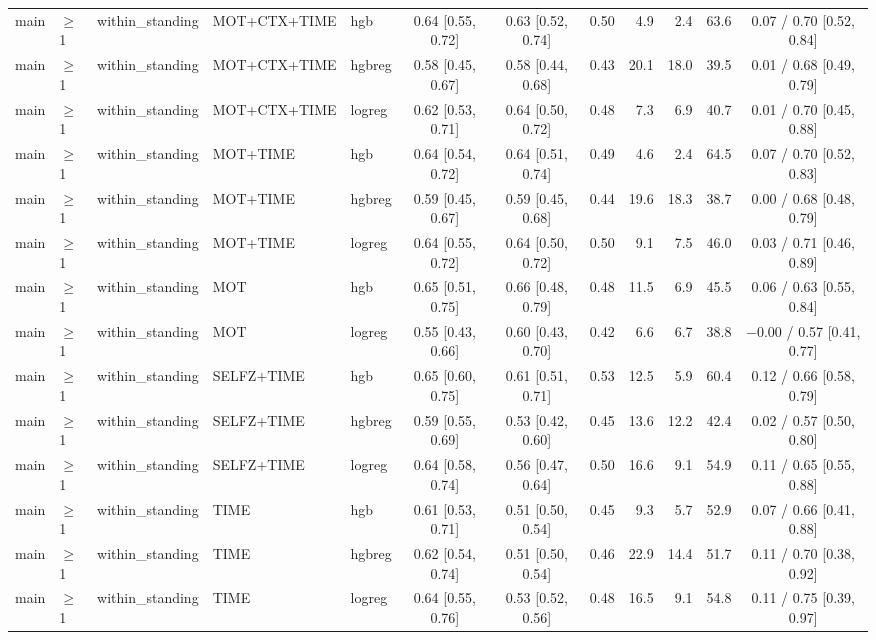 \begin{longtable}{@{}lllllcccrrrc@{}}
main & $\geq$1 & within\_standing & MOT+CTX+TIME & hgb & 0.64 [0.55, 0.72] & 0.63 [0.52, 0.74] & 0.50 & 4.9 & 2.4 & 63.6 & 0.07 / 0.70 [0.52, 0.84] \\
main & $\geq$1 & within\_standing & MOT+CTX+TIME & hgbreg & 0.58 [0.45, 0.67] & 0.58 [0.44, 0.68] & 0.43 & 20.1 & 18.0 & 39.5 & 0.01 / 0.68 [0.49, 0.79] \\
main & $\geq$1 & within\_standing & MOT+CTX+TIME & logreg & 0.62 [0.53, 0.71] & 0.64 [0.50, 0.72] & 0.48 & 7.3 & 6.9 & 40.7 & 0.01 / 0.70 [0.45, 0.88] \\
main & $\geq$1 & within\_standing & MOT+TIME & hgb & 0.64 [0.54, 0.72] & 0.64 [0.51, 0.74] & 0.49 & 4.6 & 2.4 & 64.5 & 0.07 / 0.70 [0.52, 0.83] \\
main & $\geq$1 & within\_standing & MOT+TIME & hgbreg & 0.59 [0.45, 0.67] & 0.59 [0.45, 0.68] & 0.44 & 19.6 & 18.3 & 38.7 & 0.00 / 0.68 [0.48, 0.79] \\
main & $\geq$1 & within\_standing & MOT+TIME & logreg & 0.64 [0.55, 0.72] & 0.64 [0.50, 0.72] & 0.50 & 9.1 & 7.5 & 46.0 & 0.03 / 0.71 [0.46, 0.89] \\
main & $\geq$1 & within\_standing & MOT & hgb & 0.65 [0.51, 0.75] & 0.66 [0.48, 0.79] & 0.48 & 11.5 & 6.9 & 45.5 & 0.06 / 0.63 [0.55, 0.84] \\
main & $\geq$1 & within\_standing & MOT & logreg & 0.55 [0.43, 0.66] & 0.60 [0.43, 0.70] & 0.42 & 6.6 & 6.7 & 38.8 & $-$0.00 / 0.57 [0.41, 0.77] \\
main & $\geq$1 & within\_standing & SELFZ+TIME & hgb & 0.65 [0.60, 0.75] & 0.61 [0.51, 0.71] & 0.53 & 12.5 & 5.9 & 60.4 & 0.12 / 0.66 [0.58, 0.79] \\
main & $\geq$1 & within\_standing & SELFZ+TIME & hgbreg & 0.59 [0.55, 0.69] & 0.53 [0.42, 0.60] & 0.45 & 13.6 & 12.2 & 42.4 & 0.02 / 0.57 [0.50, 0.80] \\
main & $\geq$1 & within\_standing & SELFZ+TIME & logreg & 0.64 [0.58, 0.74] & 0.56 [0.47, 0.64] & 0.50 & 16.6 & 9.1 & 54.9 & 0.11 / 0.65 [0.55, 0.88] \\
main & $\geq$1 & within\_standing & TIME & hgb & 0.61 [0.53, 0.71] & 0.51 [0.50, 0.54] & 0.45 & 9.3 & 5.7 & 52.9 & 0.07 / 0.66 [0.41, 0.88] \\
main & $\geq$1 & within\_standing & TIME & hgbreg & 0.62 [0.54, 0.74] & 0.51 [0.50, 0.54] & 0.46 & 22.9 & 14.4 & 51.7 & 0.11 / 0.70 [0.38, 0.92] \\
main & $\geq$1 & within\_standing & TIME & logreg & 0.64 [0.55, 0.76] & 0.53 [0.52, 0.56] & 0.48 & 16.5 & 9.1 & 54.8 & 0.11 / 0.75 [0.39, 0.97] \\

\end{longtable}
